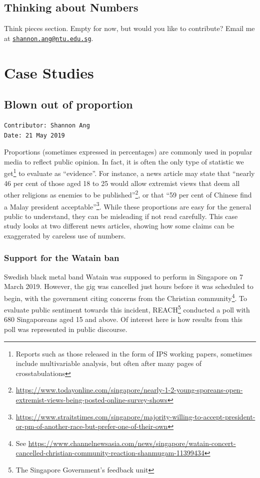 \documentclass[openany]{book}
\let\rmarkdownfootnote\footnote%
\def\footnote{\protect\rmarkdownfootnote}
\begin{document}
\chapter{Thinking about Numbers}\label{think}

Think pieces section. Empty for now, but would you like to contribute?
Email me at
\href{mailto:shannon.ang@ntu.edu.sg}{\nolinkurl{shannon.ang@ntu.edu.sg}}.

\part{Case Studies}\label{part-case-studies}

\chapter{Blown out of proportion}\label{oop}

\begin{verbatim}
Contributor: Shannon Ang
Date: 21 May 2019
\end{verbatim}

Proportions (sometimes expressed in percentages) are commonly used in
popular media to reflect public opinion. In fact, it is often the only
type of statistic we get\footnote{Reports such as those released in the
  form of IPS working papers, sometimes include multivariable analysis,
  but often after many pages of crosstabulations} to evaluate as
``evidence''. For instance, a news article may state that ``nearly 46
per cent of those aged 18 to 25 would allow extremist views that deem
all other religions as enemies to be published''\footnote{\url{https://www.todayonline.com/singapore/nearly-1-2-young-sporeans-open-extremist-views-being-posted-online-survey-shows}},
or that ``59 per cent of Chinese find a Malay president
acceptable''\footnote{\url{https://www.straitstimes.com/singapore/majority-willing-to-accept-president-or-pm-of-another-race-but-prefer-one-of-their-own}}.
While these proportions are easy for the general public to understand,
they can be misleading if not read carefully. This case study looks at
two different news articles, showing how some claims can be exaggerated
by careless use of numbers.

\section{Support for the Watain ban}\label{watain}

Swedish black metal band Watain was supposed to perform in Singapore on
7 March 2019. However, the gig was cancelled just hours before it was
scheduled to begin, with the government citing concerns from the
Christian community\footnote{See
  \url{https://www.channelnewsasia.com/news/singapore/watain-concert-cancelled-christian-community-reaction-shanmugam-11399434}}.
To evaluate public sentiment towards this incident, REACH\footnote{The
  Singapore Government's feedback unit} conducted a poll with 680
Singaporeans aged 15 and above. Of interest here is how results from
this poll was represented in public discourse.
\end{document}
